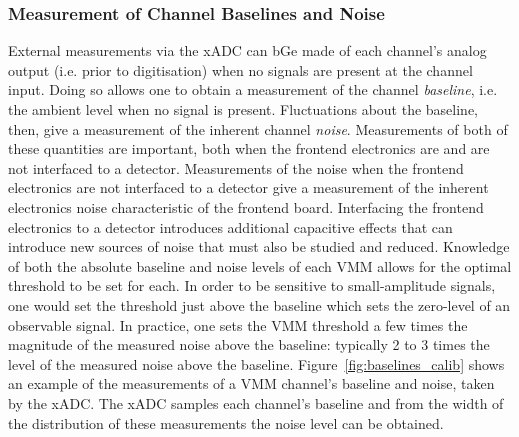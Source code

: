 \subsubsection{Measurement of Channel Baselines and Noise}
\label{sec:calib_baselines}

External measurements via the xADC can bGe made of each channel's analog output (i.e. prior
to digitisation) when no signals are present at the channel input.
Doing so allows one to obtain a measurement of the channel \textit{baseline}, i.e. the
ambient level when no signal is present.
Fluctuations about the baseline, then, give a measurement of the inherent channel \textit{noise}.
Measurements of both of these quantities are important, both when the frontend electronics
are and are not interfaced to a detector.
Measurements of the noise when the frontend electronics are not interfaced to a detector give
a measurement of the inherent electronics noise characteristic of the frontend board.
Interfacing the frontend electronics to a detector introduces additional capacitive effects
that can introduce new sources of noise that must also be studied and reduced.
Knowledge of both the absolute baseline and noise levels of each VMM allows for the optimal threshold
to be set for each.
In order to be sensitive to small-amplitude signals, one would set the threshold just above the baseline
which sets the zero-level of an observable signal.
In practice, one sets the VMM threshold a few times the magnitude of the measured noise above the baseline: typically
2 to 3 times the level of the measured noise above the baseline.
Figure~\ref{fig:baselines_calib} shows an example of the measurements of a VMM channel's baseline and noise, taken by the xADC.
The xADC samples each channel's baseline and from the width of the distribution of these measurements the noise
level can be obtained.

